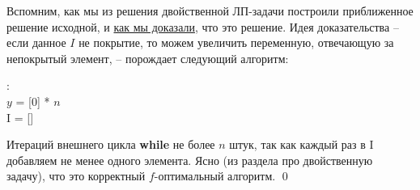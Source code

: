 Вспомним, как мы из решения двойственной ЛП-задачи построили приближенное решение исходной, и \underline{как мы доказали}, что это решение. Идея доказательства -- если данное $I$ не покрытие, то можем увеличить переменную, отвечающую за непокрытый элемент, -- порождает следующий алгоритм:

\begin{algorithm}
    :\\
    $y$ = [0] * $n$\\
    I = []\\
\end{algorithm}

Итераций внешнего цикла \textbf{while} не более $n$ штук, так как каждый раз в I добавляем не менее одного элемента. Ясно (из раздела про двойственную задачу), что это корректный $f$-оптимальный алгоритм. \qed
